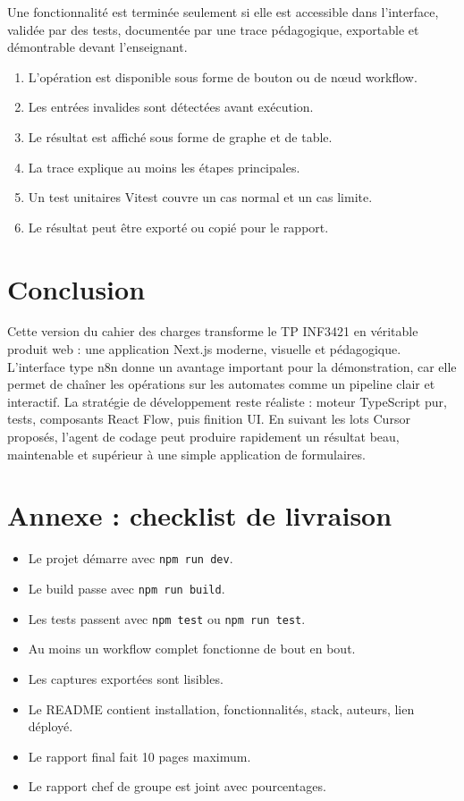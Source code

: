 \documentclass[11pt,a4paper]{report}
\newcommand{\ok}{\textcolor{uygreen}{\ding{51}}}
\newcommand{\code}[1]{\texttt{#1}}
\begin{document}
\begin{successbox}
Une fonctionnalité est terminée seulement si elle est accessible dans l'interface, validée par des tests, documentée par une trace pédagogique, exportable et démontrable devant l'enseignant.
\end{successbox}

\begin{enumerate}
  \item L'opération est disponible sous forme de bouton ou de nœud workflow.
  \item Les entrées invalides sont détectées avant exécution.
  \item Le résultat est affiché sous forme de graphe et de table.
  \item La trace explique au moins les étapes principales.
  \item Un test unitaires Vitest couvre un cas normal et un cas limite.
  \item Le résultat peut être exporté ou copié pour le rapport.
\end{enumerate}

\chapter*{Conclusion}

Cette version du cahier des charges transforme le TP INF3421 en véritable produit web : une application Next.js moderne, visuelle et pédagogique. L'interface type n8n donne un avantage important pour la démonstration, car elle permet de chaîner les opérations sur les automates comme un pipeline clair et interactif. La stratégie de développement reste réaliste : moteur TypeScript pur, tests, composants React Flow, puis finition UI. En suivant les lots Cursor proposés, l'agent de codage peut produire rapidement un résultat beau, maintenable et supérieur à une simple application de formulaires.

\appendix
\chapter{Annexe : checklist de livraison}
\begin{itemize}
  \item \ok{} Le projet démarre avec \code{npm run dev}.
  \item \ok{} Le build passe avec \code{npm run build}.
  \item \ok{} Les tests passent avec \code{npm test} ou \code{npm run test}.
  \item \ok{} Au moins un workflow complet fonctionne de bout en bout.
  \item \ok{} Les captures exportées sont lisibles.
  \item \ok{} Le README contient installation, fonctionnalités, stack, auteurs, lien déployé.
  \item \ok{} Le rapport final fait 10 pages maximum.
  \item \ok{} Le rapport chef de groupe est joint avec pourcentages.
\end{itemize}
\end{document}
